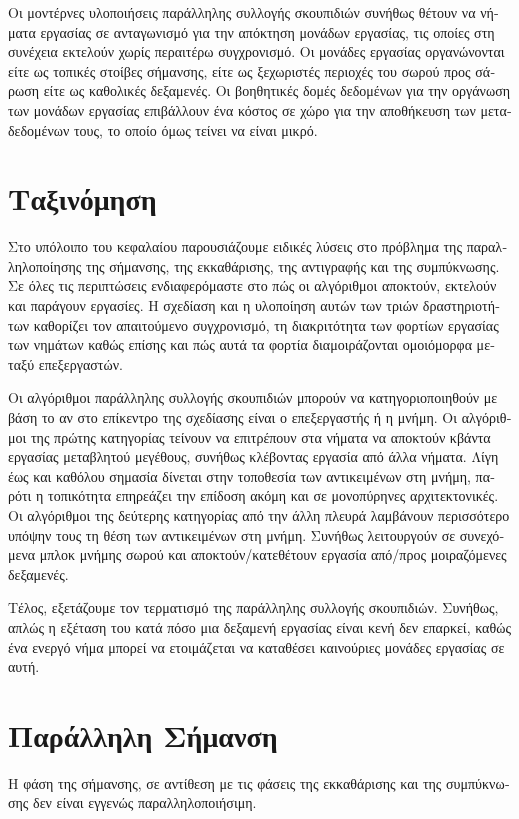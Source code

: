 \begin{greek}
Οι μοντέρνες υλοποιήσεις παράλληλης συλλογής σκουπιδιών συνήθως
θέτουν να νήματα εργασίας σε ανταγωνισμό για την απόκτηση
μονάδων εργασίας, τις οποίες στη συνέχεια εκτελούν χωρίς περαιτέρω
συγχρονισμό. Οι μονάδες εργασίας οργανώνονται είτε ως τοπικές
στοίβες σήμανσης, είτε ως ξεχωριστές περιοχές του σωρού προς
σάρωση είτε ως καθολικές δεξαμενές. Οι βοηθητικές δομές δεδομένων
για την οργάνωση των μονάδων εργασίας επιβάλλουν ένα κόστος σε
χώρο για την αποθήκευση των μεταδεδομένων τους, το οποίο όμως
τείνει να είναι μικρό.

\section{Ταξινόμηση}
Στο υπόλοιπο του κεφαλαίου παρουσιάζουμε ειδικές λύσεις στο
πρόβλημα της παραλληλοποίησης της σήμανσης, της εκκαθάρισης,
της αντιγραφής και της συμπύκνωσης. Σε όλες τις περιπτώσεις
ενδιαφερόμαστε στο πώς οι αλγόριθμοι αποκτούν, εκτελούν και
παράγουν εργασίες. Η σχεδίαση και η υλοποίηση αυτών των τριών
δραστηριοτήτων καθορίζει τον απαιτούμενο συγχρονισμό, τη
διακριτότητα των φορτίων εργασίας των νημάτων καθώς επίσης
και πώς αυτά τα φορτία διαμοιράζονται ομοιόμορφα μεταξύ
επεξεργαστών.

Οι αλγόριθμοι παράλληλης συλλογής σκουπιδιών μπορούν να
κατηγοριοποιηθούν με βάση το αν στο επίκεντρο της σχεδίασης
είναι ο επεξεργαστής ή η μνήμη. Οι αλγόριθμοι της πρώτης
κατηγορίας τείνουν να επιτρέπουν στα νήματα να αποκτούν κβάντα
εργασίας μεταβλητού μεγέθους, συνήθως κλέβοντας εργασία
από άλλα νήματα. Λίγη έως και καθόλου σημασία δίνεται στην
τοποθεσία των αντικειμένων στη μνήμη, παρότι η τοπικότητα
επηρεάζει την επίδοση ακόμη και σε μονοπύρηνες αρχιτεκτονικές.
Οι αλγόριθμοι της δεύτερης κατηγορίας από την άλλη πλευρά
λαμβάνουν περισσότερο υπόψην τους τη θέση των αντικειμένων
στη μνήμη. Συνήθως λειτουργούν σε συνεχόμενα μπλοκ μνήμης
σωρού και αποκτούν/κατεθέτουν εργασία από/προς μοιραζόμενες
δεξαμενές.

Τέλος, εξετάζουμε τον τερματισμό της παράλληλης συλλογής
σκουπιδιών. Συνήθως, απλώς η εξέταση του κατά πόσο μια δεξαμενή
εργασίας είναι κενή δεν επαρκεί, καθώς ένα ενεργό νήμα μπορεί
να ετοιμάζεται να καταθέσει καινούριες μονάδες εργασίας σε αυτή.

\section{Παράλληλη Σήμανση}
Η φάση της σήμανσης, σε αντίθεση με τις φάσεις της εκκαθάρισης
και της συμπύκνωσης δεν είναι εγγενώς παραλληλοποιήσιμη.


\end{greek}
